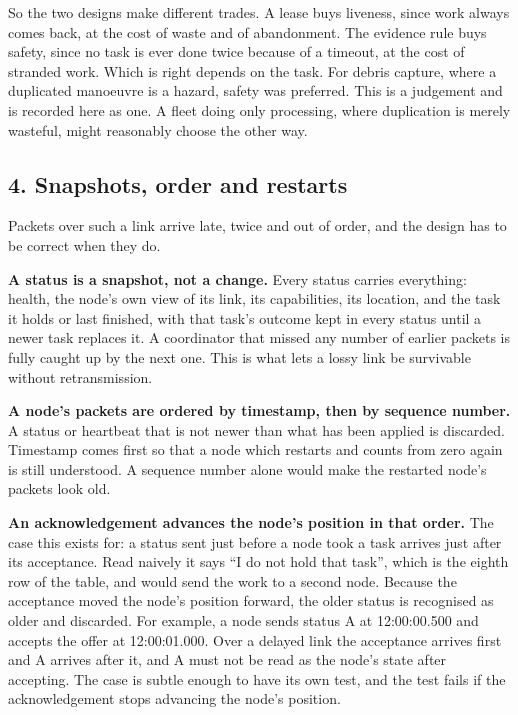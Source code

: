 \documentclass[
  12pt,
  letterpaper,
]{article}
\begin{document}
So the two designs make different trades. A lease buys liveness, since
work always comes back, at the cost of waste and of abandonment. The
evidence rule buys safety, since no task is ever done twice because of a
timeout, at the cost of stranded work. Which is right depends on the
task. For debris capture, where a duplicated manoeuvre is a hazard,
safety was preferred. This is a judgement and is recorded here as one. A
fleet doing only processing, where duplication is merely wasteful, might
reasonably choose the other way.

\hypertarget{snapshots-order-and-restarts}{%
\subsection{4. Snapshots, order and
restarts}\label{snapshots-order-and-restarts}}

Packets over such a link arrive late, twice and out of order, and the
design has to be correct when they do.

\textbf{A status is a snapshot, not a change.} Every status carries
everything: health, the node's own view of its link, its capabilities,
its location, and the task it holds or last finished, with that task's
outcome kept in every status until a newer task replaces it. A
coordinator that missed any number of earlier packets is fully caught up
by the next one. This is what lets a lossy link be survivable without
retransmission.

\textbf{A node's packets are ordered by timestamp, then by sequence
number.} A status or heartbeat that is not newer than what has been
applied is discarded. Timestamp comes first so that a node which
restarts and counts from zero again is still understood. A sequence
number alone would make the restarted node's packets look old.

\textbf{An acknowledgement advances the node's position in that order.}
The case this exists for: a status sent just before a node took a task
arrives just after its acceptance. Read naively it says ``I do not hold
that task'', which is the eighth row of the table, and would send the
work to a second node. Because the acceptance moved the node's position
forward, the older status is recognised as older and discarded. For
example, a node sends status A at 12:00:00.500 and accepts the offer at
12:00:01.000. Over a delayed link the acceptance arrives first and A
arrives after it, and A must not be read as the node's state after
accepting. The case is subtle enough to have its own test, and the test
fails if the acknowledgement stops advancing the node's position.
\end{document}
